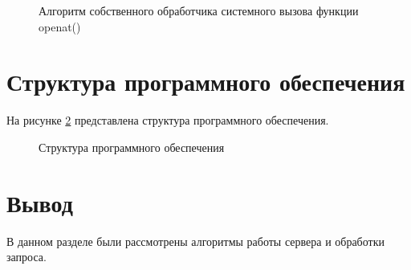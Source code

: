 \begin{figure}[ph!]
	\caption{Алгоритм собственного обработчика системного вызова функции openat()}
	\label{fig:openat}
\end{figure}

\section{Структура программного обеспечения}

На рисунке \ref{fig:struct} представлена структура программного обеспечения.

\clearpage

\begin{figure}[ph!]
	\caption{Структура программного обеспечения}
	\label{fig:struct}
\end{figure}

\section*{Вывод}
В данном разделе были рассмотрены алгоритмы работы сервера и обработки запроса.


